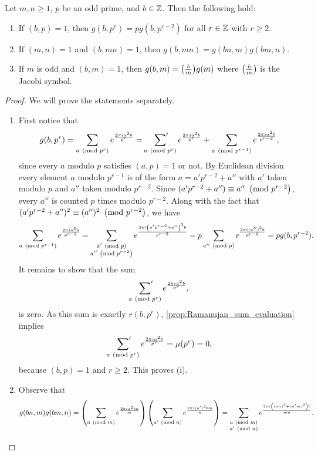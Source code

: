       \begin{proposition}\label{prop:quadratic_Gauss_sum_reduction}
        Let $m,n \ge 1$, $p$ be an odd prime, and $b \in \mathbb{Z}$. Then the following hold:
        \begin{enumerate}[label=(\roman*)]
          \item If $(b,p) = 1$, then $g(b,p^{r}) = pg(b,p^{r-2})$ for all $r \in \mathbb{Z}$ with $r \ge 2$.
          \item If $(m,n) = 1$ and $(b,mn) = 1$, then $g(b,mn) = g(bn,m)g(bm,n)$.
          \item If $m$ is odd and $(b,m) = 1$, then $g(b,m) = \textstyle{\left(\frac{b}{m}\right)}g(m)$ where $\textstyle{\left(\frac{b}{m}\right)}$ is the Jacobi symbol.
        \end{enumerate}
      \end{proposition}
      \begin{proof}
        We will prove the statements separately.
        \begin{enumerate}[label=(\roman*)]
          \item First notice that
          \[
            g(b,p^{r}) = \sum_{a \ \left(\text{mod }p^{r}\right)}e^{\frac{2\pi ia^{2}b}{p^{r}}} = \sideset{}{'}\sum_{a \ \left(\text{mod }p^{r}\right)}e^{\frac{2\pi ia^{2}b}{p^{r}}}+\sum_{a \ \left(\text{mod }p^{r-1}\right)}e^{\frac{2\pi ia^{2}b}{p^{r-2}}},
          \]
          since every $a$ modulo $p$ satisfies $(a,p) = 1$ or not. By Euclidean division every element $a$ modulo $p^{r-1}$ is of the form $a = a'p^{r-2}+a''$ with $a'$ taken modulo $p$ and $a''$ taken modulo $p^{r-2}$. Since $(a'p^{r-2}+a'') \equiv a'' \ \left(\text{mod }p^{r-2}\right)$, every $a''$ is counted $p$ times modulo $p^{r-2}$. Along with the fact that $(a'p^{r-2}+a'')^{2} \equiv (a'')^{2} \ \left(\text{mod }p^{r-2}\right)$, we have
          \[
            \sum_{a \ \left(\text{mod }p^{r-1}\right)}e^{\frac{2\pi ia^{2}b}{p^{r-2}}} = \sum_{\substack{a' \ \left(\text{mod }p\right) \\ a'' \ \left(\text{mod }p^{r-2}\right)}}e^{\frac{2\pi i\left(a'p^{r-2}+a''\right)^{2}b}{p^{r-2}}} = p\sum_{a'' \ \left(\text{mod }p\right)}e^{\frac{2\pi i(a'')^{2}b}{p^{r-2}}} = pg(b,p^{r-2}).
          \]
          It remains to show that the sum
          \[
            \sideset{}{'}\sum_{a \ \left(\text{mod }p^{r}\right)}e^{\frac{2\pi ia^{2}b}{p^{r}}},
          \]
          is zero. As this sum is exactly $r(b,p^{r})$, \cref{prop:Ramanujan_sum_evaluation} implies
          \[
            \sideset{}{'}\sum_{a \ \left(\text{mod }p^{r}\right)}e^{\frac{2\pi ia^{2}b}{p^{r}}} = \mu(p^{r}) = 0,
          \]
          because $(b,p) = 1$ and $r \ge 2$. This proves (i).
          \item Observe that
            \[
              g(bn,m)g(bm,n) = \left(\sum_{a \ \left(\text{mod }m\right)}e^{\frac{2\pi ia^{2}bn}{m}}\right)\left(\sum_{a' \ \left(\text{mod }n\right)}e^{\frac{2\pi i(a')^{2}bm}{n}}\right) = \sum_{\substack{a \ \left(\text{mod }m\right) \\ a' \ \left(\text{mod }n\right)}}e^{\frac{2\pi i\left((an)^{2}+(a'm)^{2}\right)b}{mn}}.
\]
\end{enumerate}
\end{proof}
